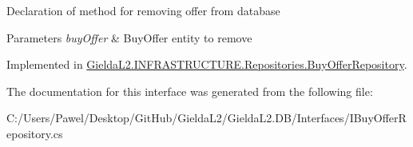 Declaration of method for removing offer from database 


\begin{DoxyParams}{Parameters}
{\em buy\+Offer} & Buy\+Offer entity to remove\\
\hline
\end{DoxyParams}


Implemented in \mbox{\hyperlink{class_gielda_l2_1_1_i_n_f_r_a_s_t_r_u_c_t_u_r_e_1_1_repositories_1_1_buy_offer_repository_a14dec5a8063f5d8b6a106f65fc6ec293}{Gielda\+L2.\+I\+N\+F\+R\+A\+S\+T\+R\+U\+C\+T\+U\+R\+E.\+Repositories.\+Buy\+Offer\+Repository}}.



The documentation for this interface was generated from the following file\+:\begin{DoxyCompactItemize}
\item 
C\+:/\+Users/\+Pawel/\+Desktop/\+Git\+Hub/\+Gielda\+L2/\+Gielda\+L2.\+D\+B/\+Interfaces/I\+Buy\+Offer\+Repository.\+cs\end{DoxyCompactItemize}
